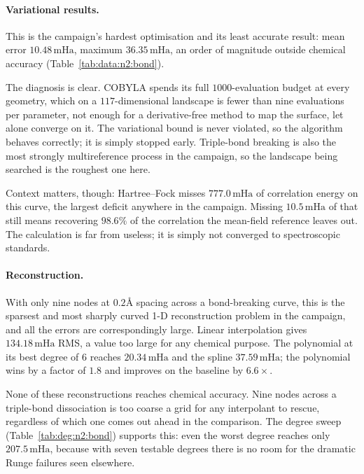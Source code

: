 \documentclass[sigconf,screen,nonacm]{acmart}
\newcommand{\mHa}{\,\text{mHa}}
\newcommand{\Ang}{\text{\AA}}
\begin{document}
\paragraph{Variational results.}
This is the campaign's hardest optimisation and its least accurate result:
mean error $10.48\mHa$, maximum $36.35\mHa$, an order of magnitude outside
chemical accuracy (Table~\ref{tab:data:n2:bond}).

The diagnosis is clear. COBYLA spends its full $1000$-evaluation budget at
every geometry, which on a $117$-dimensional landscape is fewer than nine
evaluations per parameter, not enough for a derivative-free method to map the
surface, let alone converge on it. The variational bound is never violated,
so the algorithm behaves correctly; it is simply stopped early. Triple-bond
breaking is also the most strongly multireference process in the campaign,
so the landscape being searched is the roughest one here.

Context matters, though: Hartree--Fock misses $777.0\mHa$ of correlation
energy on this curve, the largest deficit anywhere in the campaign. Missing
$10.5\mHa$ of that still means recovering $98.6\%$ of the correlation the
mean-field reference leaves out. The calculation is far from useless; it is
simply not converged to spectroscopic standards.




\paragraph{Reconstruction.}
With only nine nodes at $0.2\Ang$ spacing across a bond-breaking curve, this
is the sparsest and most sharply curved 1-D reconstruction problem in the
campaign, and all the errors are correspondingly large. Linear interpolation
gives $134.18\mHa$ RMS, a value too large for any chemical purpose. The
polynomial at its best degree of $6$ reaches $20.34\mHa$ and the spline
$37.59\mHa$; the polynomial wins by a factor of $1.8$ and improves on the
baseline by $6.6\times$.

None of these reconstructions reaches chemical accuracy. Nine nodes across a
triple-bond dissociation is too coarse a grid for any interpolant to rescue,
regardless of which one comes out ahead in the comparison. The degree sweep (Table~\ref{tab:deg:n2:bond})
supports this: even the worst degree reaches only $207.5\mHa$, because with
seven testable degrees there is no room for the dramatic Runge failures seen
elsewhere.
\end{document}

